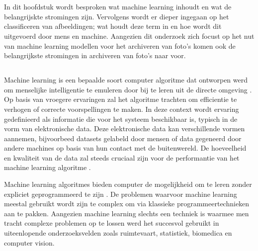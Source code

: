\chapter{}
\label{ch:stand-van-zaken}


In dit hoofdstuk wordt besproken wat machine learning inhoudt en wat de belangrijskte stromingen zijn. Vervolgens wordt er dieper ingegaan op het classificeren van afbeeldingen; wat houdt deze term in en hoe wordt dit uitgevoerd door mens en machine. Aangezien dit onderzoek zich focust op het nut van machine learning modellen voor het archiveren van foto's komen ook de belangrijkste stromingen in archiveren van foto's naar voor.

\section{}
\label{sec:machine-learning}
Machine learning is een bepaalde soort computer algoritme dat ontworpen werd om menselijke intelligentie te emuleren door bij te leren uit de directe omgeving \autocite{ElNaqa2015}. Op basis van vroegere ervaringen zal het algoritme trachten om efficientie te verhogen of correcte voorspellingen te maken. In deze context wordt ervaring gedefinieerd als informatie die voor het systeem beschikbaar is, typisch in de vorm van elektronische data. Deze elektronische data kan verschillende vormen aannemen, bijvoorbeed datasets gelabeld door mensen of data gegeneerd door andere machines op basis van hun contact met de buitenwereld. De hoeveelheid en kwaliteit van de data zal steeds cruciaal zijn voor de performantie van het machine learning algoritme \autocite{Mohri2018}.

Machine learning algoritmes bieden computer de mogelijkheid om te leren zonder expliciet geprogrammeerd te zijn \autocite{DeVreese2017}. De problemen waarvoor machine learning meestal gebruikt wordt zijn te complex om via klassieke programmeertechnieken aan te pakken. Aangezien machine learning slechts een techniek is waarmee men tracht complexe problemen op te lossen werd het succesvol gebruikt in uiteenlopende onderzoeksvelden zoals ruimtevaart, statistiek, biomedica en computer vision.


